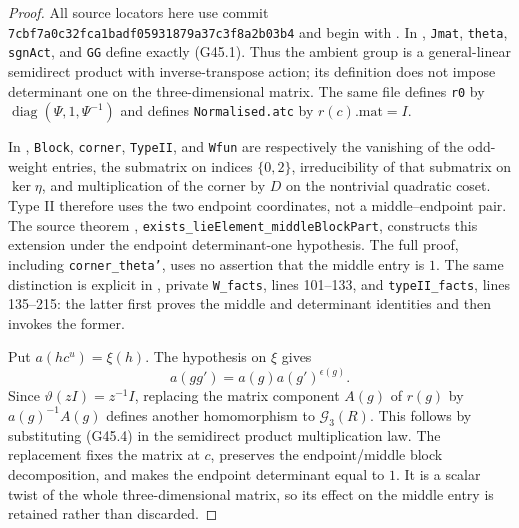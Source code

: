 \begin{proof}
All source locators here use commit
\texttt{7cbf7a0c32fca1badf05931879a37c3f8a2b03b4} and begin with
.
In ,
\texttt{Jmat}, \texttt{theta}, \texttt{sgnAct}, and \texttt{GG}
define exactly (G45.1).  Thus the ambient group is a general-linear
semidirect product with inverse-transpose action; its definition
does not impose determinant one on the three-dimensional matrix.
The same file defines
\texttt{r0} by $\operatorname{diag}(\Psi,1,\Psi^{-1})$
and defines \texttt{Normalised.atc} by $r(c).\mathrm{mat}=I$.

In ,
\texttt{Block}, \texttt{corner}, \texttt{TypeII}, and \texttt{Wfun}
are respectively the vanishing of the odd-weight entries, the
submatrix on indices $\{0,2\}$, irreducibility of that submatrix
on $\ker\eta$, and multiplication of the corner by $D$ on the
nontrivial quadratic coset.  Type II therefore uses the two
endpoint coordinates, not a middle--endpoint pair.
The source theorem
,
\texttt{exists\_lieElement\_middleBlockPart}, constructs this
extension under the endpoint determinant-one hypothesis.
The full proof, including \texttt{corner\_theta'}, uses no assertion
that the middle entry is $1$.
The same distinction is explicit in
,
private \texttt{W\_facts}, lines 101--133, and
\texttt{typeII\_facts}, lines 135--215: the latter first proves
the middle and determinant identities and then invokes the former.

Put $a(hc^u)=\xi(h)$.  The hypothesis on $\xi$ gives
\[
             a(gg')=a(g)a(g')^{\epsilon(g)}.          \tag{G45.4}
\]
Since $\vartheta(zI)=z^{-1}I$, replacing the matrix component
$A(g)$ of $r(g)$ by $a(g)^{-1}A(g)$ defines another homomorphism
to $\mathcal G_3(R)$.  This follows by substituting (G45.4)
in the semidirect product multiplication law.  The replacement
fixes the matrix at $c$, preserves the endpoint/middle block
decomposition, and makes the endpoint determinant equal to $1$.
It is a scalar twist of the whole three-dimensional matrix, so
its effect on the middle entry is retained rather than discarded.


\end{proof}
